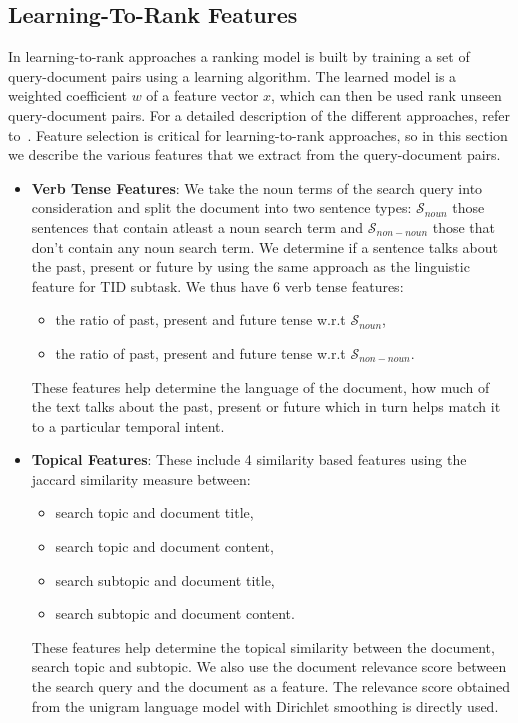 \documentclass{sig-alternate}
\begin{document}
\subsection{Learning-To-Rank Features}\label{ltor_f}
In learning-to-rank approaches a ranking model is built by training a set of query-document pairs using a learning algorithm. The learned model is a weighted coefficient $w$ of a feature vector $x$, which can then be used rank unseen query-document pairs. For a detailed description of the different approaches, refer to~\cite{ltor}. Feature selection is critical for learning-to-rank approaches, so in this section we describe the various features that we extract from the query-document pairs.
\begin{itemize}
\item\textbf{Verb Tense Features}: We take the noun terms of the search query into consideration and split the document into two sentence types: $\mathcal S_{noun}$ those sentences that contain atleast a noun search term and $\mathcal S_{non-noun}$ those that don't contain any noun search term. We determine if a sentence talks about the past, present or future by using the same approach as the linguistic feature for TID subtask. We thus have \textsf{6 verb tense features}: 
\begin{itemize}
\item the ratio of past, present and future tense w.r.t $\mathcal S_{noun}$,
\item the ratio of past, present and future tense w.r.t $\mathcal S_{non-noun}$. 
\end{itemize}
These features help determine the language of the document, how much of the text talks about the past, present or future which in turn helps match it to a particular temporal intent. 
\item\textbf{Topical Features}: These include \textsf{4 similarity based features} using the jaccard similarity measure between:
   \begin{itemize}
       \item search topic and document title,
       \item search topic and document content,
       \item search subtopic and document title, 
       \item search subtopic and document content. 
   \end{itemize}
These features help determine the topical similarity between the document, search topic and subtopic. We also use the \textsf{document relevance score} between the search query and the document as a feature. The relevance score obtained from the unigram language model with Dirichlet smoothing is directly used. 

\end{itemize}
\end{document}
